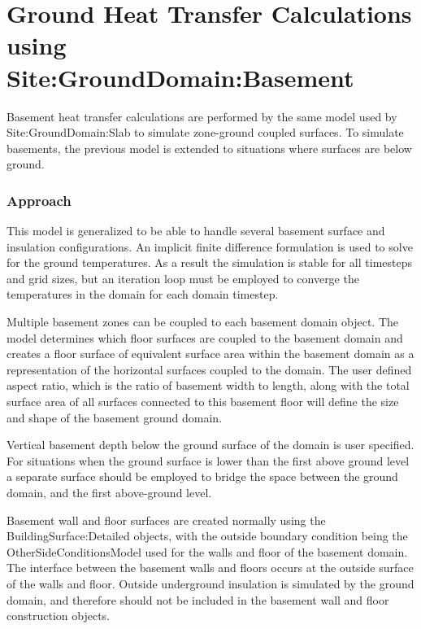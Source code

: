 \section{Ground Heat Transfer Calculations using Site:GroundDomain:Basement}\label{ground-heat-transfer-calculations-using-sitegrounddomainbasement}

Basement heat transfer calculations are performed by the same model used by Site:GroundDomain:Slab to simulate zone-ground coupled surfaces. To simulate basements, the previous model is extended to situations where surfaces are below ground.

\subsubsection{Approach}\label{approach-000}

This model is generalized to be able to handle several basement surface and insulation configurations. An implicit finite difference formulation is used to solve for the ground temperatures. As a result the simulation is stable for all timesteps and grid sizes, but an iteration loop must be employed to converge the temperatures in the domain for each domain timestep.

Multiple basement zones can be coupled to each basement domain object. The model determines which floor surfaces are coupled to the basement domain and creates a floor surface of equivalent surface area within the basement domain as a representation of the horizontal surfaces coupled to the domain. The user defined aspect ratio, which is the ratio of basement width to length, along with the total surface area of all surfaces connected to this basement floor will define the size and shape of the basement ground domain.

Vertical basement depth below the ground surface of the domain is user specified. For situations when the ground surface is lower than the first above ground level a separate surface should be employed to bridge the space between the ground domain, and the first above-ground level.

Basement wall and floor surfaces are created normally using the BuildingSurface:Detailed objects, with the outside boundary condition being the OtherSideConditionsModel used for the walls and floor of the basement domain. The interface between the basement walls and floors occurs at the outside surface of the walls and floor. Outside underground insulation is simulated by the ground domain, and therefore should not be included in the basement wall and floor construction objects.

